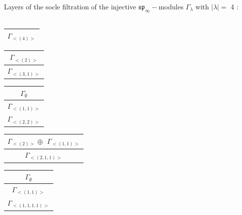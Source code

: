 \bigskip
Layers of the socle filtration of the injective $\mathfrak{sp}_\infty-$modules $\Gamma_{\lambda}$ with $|\lambda| = $ 4 : \\\\
\begin{minipage}{.2\textwidth}
\centering
\begin{tabular}{|c|}\hline
$\Gamma_{<(
4
)>}$
\\
\hline\end{tabular}\end{minipage}
\begin{minipage}{.2\textwidth}
\centering
\begin{tabular}{|c|}\hline
$\Gamma_{<(
2
)>}$
\\ \hline
$\Gamma_{<(
3 , 
1
)>}$
\\
\hline\end{tabular}\end{minipage}
\begin{minipage}{.2\textwidth}
\centering
\begin{tabular}{|c|}\hline
$\Gamma_\emptyset$
\\ \hline
$\Gamma_{<(
1 , 
1
)>}$
\\ \hline
$\Gamma_{<(
2 , 
2
)>}$
\\
\hline\end{tabular}\end{minipage}
\begin{minipage}{.2\textwidth}
\centering
\begin{tabular}{|c|}\hline
$\Gamma_{<(
2
)>} \oplus$
$\Gamma_{<(
1 , 
1
)>}$
\\ \hline
$\Gamma_{<(
2 , 
1 , 
1
)>}$
\\
\hline\end{tabular}\end{minipage}
\begin{minipage}{.2\textwidth}
\centering
\begin{tabular}{|c|}\hline
$\Gamma_\emptyset$
\\ \hline
$\Gamma_{<(
1 , 
1
)>}$
\\ \hline
$\Gamma_{<(
1 , 
1 , 
1 , 
1
)>}$
\\
\hline\end{tabular}\end{minipage}
\\



